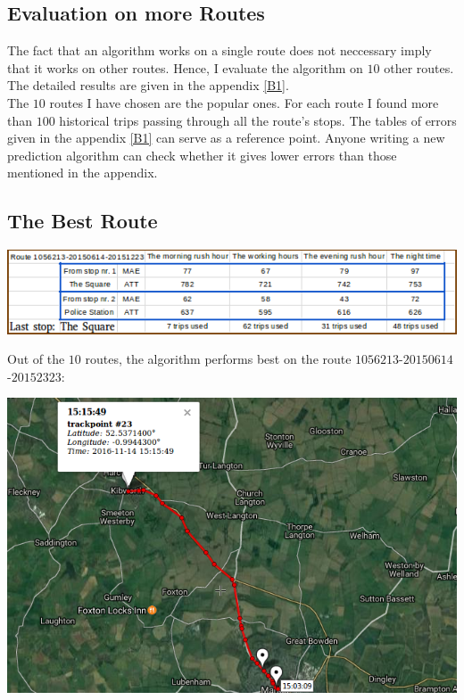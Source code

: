 \documentclass[12pt,a4paper,oneside,openright]{report}
\begin{document}
\subsection{Evaluation on more Routes}

The fact that an algorithm works on a single route does not neccessary imply that
it works on other routes. Hence, I evaluate the algorithm on $10$ other routes. The
detailed results are given in the appendix \ref{B1}. \\

The $10$ routes I have chosen are the popular ones. For each route I found
more than $100$ historical trips passing through all the route's stops. The tables of
errors given in the appendix \ref{B1} can serve as a reference point. Anyone writing a
new prediction algorithm can check whether it gives lower errors than those mentioned
in the appendix.

\subsection*{The Best Route}

\includegraphics[width=\textwidth]{figs/table_of_1056213.png}

Out of the $10$ routes, the algorithm performs best on the route
$1056213$-$20150614$-$20152323$:

\includegraphics[scale=0.65]{figs/best_route.png}
\end{document}
